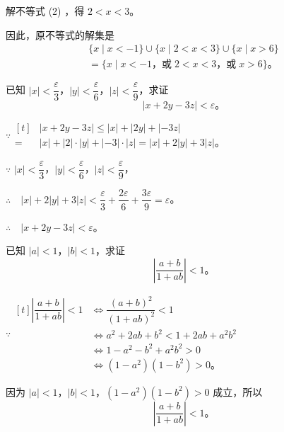 解不等式 (2) ，得 $2 < x < 3$。

因此，原不等式的解集是
\begin{gather*}
    \{ x \mid x < -1 \} \cup \{ x \mid 2 < x < 3 \} \cup \{ x \mid x > 6 \} \\
    = \{ x \mid x < -1 \text{，或}\; 2 < x < 3 \text{，或}\; x > 6 \} \text{。}
\end{gather*}


\liti 已知 $|x| < \dfrac{\varepsilon}{3}$，$|y| < \dfrac{\varepsilon}{6}$，$|z| < \dfrac{\varepsilon}{9}$，求证
$$ |x + 2y - 3z| < \varepsilon \text{。} $$

\zhengming \; $\because \begin{aligned}[t]
        & |x + 2y - 3z| \leqslant |x| + |2y| + |-3z| \\
    ={} & |x| + |2| \cdot |y| + |-3| \cdot |z| = |x| + 2|y| + 3|z| \text{。}
\end{aligned}$

$\because$ \quad $|x| < \dfrac{\varepsilon}{3}$，$|y| < \dfrac{\varepsilon}{6}$，$|z| < \dfrac{\varepsilon}{9}$，

$\therefore \quad |x| + 2|y| + 3|z| < \dfrac{\varepsilon}{3} + \dfrac{2\varepsilon}{6} + \dfrac{3\varepsilon}{9} = \varepsilon$。

$\therefore \quad |x + 2y - 3z| < \varepsilon$。


\liti 已知 $|a| < 1$，$|b| < 1$，求证
$$ \left| \dfrac{a + b}{1 + ab} \right| < 1 \text{。} $$

\zhengming \; $\because \begin{aligned}[t]
    \left| \dfrac{a + b}{1 + ab} \right| < 1 & \iff \dfrac{(a + b)^2}{(1 + ab)^2} < 1 \\
    & \iff a^2 + 2ab + b^2 < 1 + 2ab + a^2b^2 \\
    & \iff 1 - a^2 - b^2 + a^2b^2 > 0 \\
    & \iff (1 - a^2)(1 - b^2) > 0 \text{。}
\end{aligned}$

因为 $|a| < 1$，$|b| < 1$，$(1 - a^2)(1 - b^2) > 0$ 成立，所以
$$ \left| \dfrac{a + b}{1 + ab} \right| < 1 \text{。} $$


